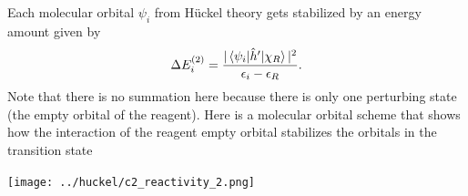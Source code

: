 \documentclass[../Main/chem532-notes.tex]{subfiles}
\begin{document}
\begin{center}
\end{center}



Each  molecular orbital $\psi_i$ from H\"{u}ckel theory gets stabilized by an energy amount given by
\begin{equation}
\Delta E_i^{(2)} = \frac{|\braket{\psi_i|\hat{h}'|\chi_R}|^2}{\epsilon_i - \epsilon_R}.
\end{equation}
Note that there is no summation here because there is only one perturbing state (the empty orbital of the reagent). Here is a molecular orbital scheme that shows how the interaction of the reagent empty orbital stabilizes the orbitals in the transition state

\begin{center}
\texttt{[image: ../huckel/c2\_reactivity\_2.png]}
\end{center}
\end{document}
